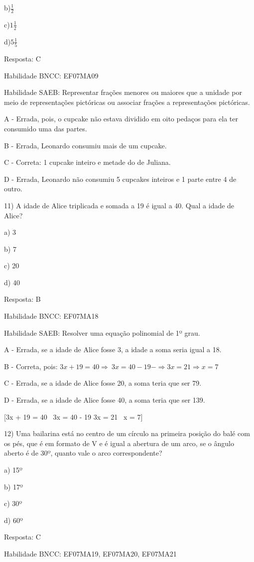 b)\(\frac{1}{2}\)

c)\(1\frac{1}{2}\)

d)\(5\frac{1}{5}\)

Resposta: C

Habilidade BNCC: EF07MA09

Habilidade SAEB: Representar frações menores ou maiores que a unidade
por meio de representações pictóricas ou associar frações a
representações pictóricas.

A - Errada, pois, o cupcake não estava dividido em oito pedaços para ela
ter consumido uma das partes.

B - Errada, Leonardo consumiu mais de um cupcake.

C - Correta: 1 cupcake inteiro e metade do de Juliana.

D - Errada, Leonardo não consumiu 5 cupcakes inteiros e 1 parte entre 4
de outro.

11) A idade de Alice triplicada e somada a 19 é igual a 40. Qual a idade
de Alice?

a) 3

b) 7

c) 20

d) 40

Resposta: B

Habilidade BNCC: EF07MA18

Habilidade SAEB: Resolver uma equação polinomial de 1º grau.

A - Errada, se a idade de Alice fosse 3, a idade a soma seria igual a
18.

B - Correta, pois:
\(3x + 19 = 40 \Rightarrow \ 3x = 40 - 19 - \Rightarrow 3x = 21 \Rightarrow x = 7\)

C - Errada, se a idade de Alice fosse 20, a soma teria que ser 79.

D - Errada, se a idade de Alice fosse 40, a soma teria que ser 139.

[3x + 19 = 40 \rightarrow \ 3x = 40 - 19 \rightarrow 3x = 21 \rightarrow \ x = 7]

12) Uma bailarina está no centro de um círculo na primeira posição do
balé com os pés, que é em formato de V e é igual a abertura de um arco,
se o ângulo aberto é de 30º, quanto vale o arco correspondente?

a) 15º

b) 17º

c) 30º

d) 60º

Resposta: C

Habilidade BNCC: EF07MA19, EF07MA20, EF07MA21

